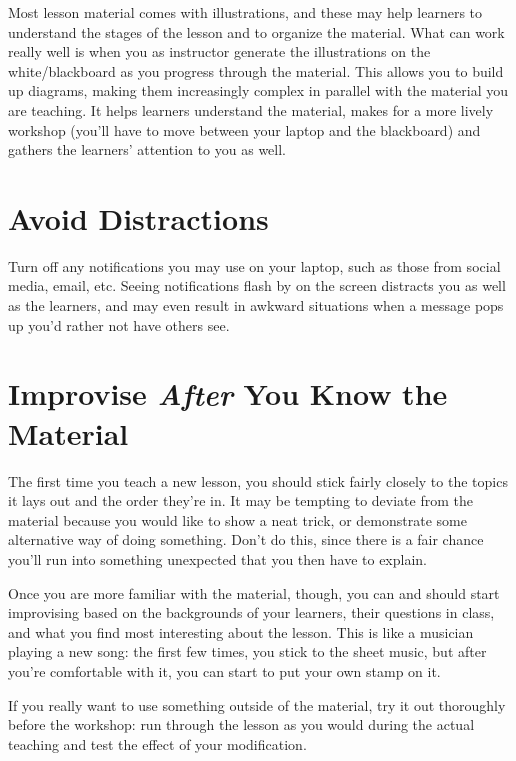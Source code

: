 \documentclass[10pt,statementpaper]{memoir}
\begin{document}
Most lesson material comes with illustrations, and these may help
learners to understand the stages of the lesson and to organize the
material. What can work really well is when you as instructor generate
the illustrations on the white/blackboard as you progress through the
material. This allows you to build up diagrams, making them increasingly
complex in parallel with the material you are teaching. It helps
learners understand the material, makes for a more lively workshop
(you'll have to move between your laptop and the blackboard) and gathers
the learners' attention to you as well.

\section{Avoid Distractions}\label{avoid-distractions}

Turn off any notifications you may use on your laptop, such as those
from social media, email, etc. Seeing notifications flash by on the
screen distracts you as well as the learners, and may even result in
awkward situations when a message pops up you'd rather not have others
see.

\section{\texorpdfstring{Improvise \emph{After} You Know the
Material}{Improvise After You Know the Material}}\label{improvise-after-you-know-the-material}

The first time you teach a new lesson, you should stick fairly closely
to the topics it lays out and the order they're in. It may be tempting
to deviate from the material because you would like to show a neat
trick, or demonstrate some alternative way of doing something. Don't do
this, since there is a fair chance you'll run into something unexpected
that you then have to explain.

Once you are more familiar with the material, though, you can and should
start improvising based on the backgrounds of your learners, their
questions in class, and what you find most interesting about the lesson.
This is like a musician playing a new song: the first few times, you
stick to the sheet music, but after you're comfortable with it, you can
start to put your own stamp on it.

If you really want to use something outside of the material, try it out
thoroughly before the workshop: run through the lesson as you would
during the actual teaching and test the effect of your modification.
\end{document}
